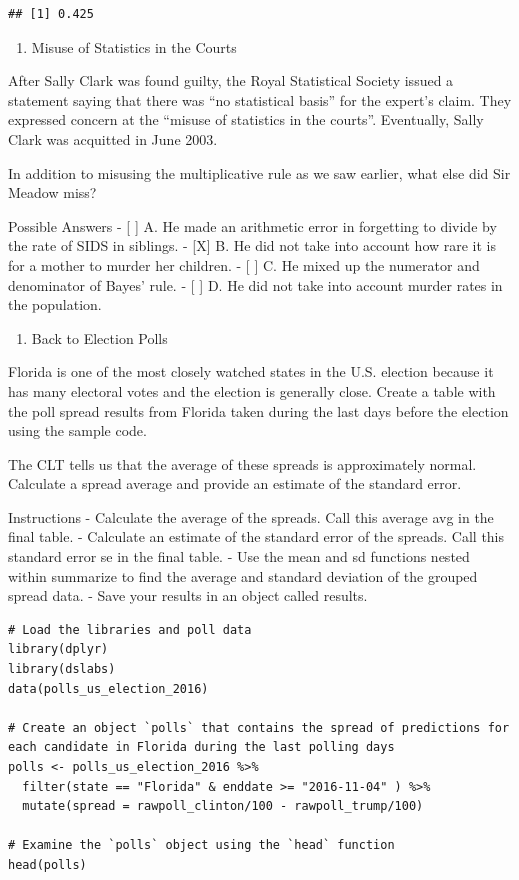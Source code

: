 \documentclass[
]{article}
\providecommand{\tightlist}{%
  \setlength{\itemsep}{0pt}\setlength{\parskip}{0pt}}
\begin{document}
\begin{verbatim}
## [1] 0.425
\end{verbatim}

\begin{enumerate}
\def\labelenumi{\arabic{enumi}.}
\setcounter{enumi}{4}
\tightlist
\item
  Misuse of Statistics in the Courts
\end{enumerate}

After Sally Clark was found guilty, the Royal Statistical Society issued
a statement saying that there was ``no statistical basis'' for the
expert's claim. They expressed concern at the ``misuse of statistics in
the courts''. Eventually, Sally Clark was acquitted in June 2003.

In addition to misusing the multiplicative rule as we saw earlier, what
else did Sir Meadow miss?

Possible Answers - {[} {]} A. He made an arithmetic error in forgetting
to divide by the rate of SIDS in siblings. - {[}X{]} B. He did not take
into account how rare it is for a mother to murder her children. - {[}
{]} C. He mixed up the numerator and denominator of Bayes' rule. - {[}
{]} D. He did not take into account murder rates in the population.

\begin{enumerate}
\def\labelenumi{\arabic{enumi}.}
\setcounter{enumi}{5}
\tightlist
\item
  Back to Election Polls
\end{enumerate}

Florida is one of the most closely watched states in the U.S. election
because it has many electoral votes and the election is generally close.
Create a table with the poll spread results from Florida taken during
the last days before the election using the sample code.

The CLT tells us that the average of these spreads is approximately
normal. Calculate a spread average and provide an estimate of the
standard error.

Instructions - Calculate the average of the spreads. Call this average
avg in the final table. - Calculate an estimate of the standard error of
the spreads. Call this standard error se in the final table. - Use the
mean and sd functions nested within summarize to find the average and
standard deviation of the grouped spread data. - Save your results in an
object called results.

\begin{verbatim}
# Load the libraries and poll data
library(dplyr)
library(dslabs)
data(polls_us_election_2016)

# Create an object `polls` that contains the spread of predictions for each candidate in Florida during the last polling days
polls <- polls_us_election_2016 %>% 
  filter(state == "Florida" & enddate >= "2016-11-04" ) %>% 
  mutate(spread = rawpoll_clinton/100 - rawpoll_trump/100)

# Examine the `polls` object using the `head` function
head(polls)
\end{verbatim}
\end{document}
